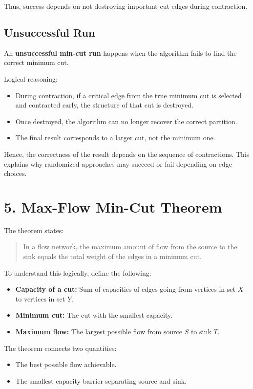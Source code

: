 \documentclass[12pt]{article}
\begin{document}
Thus, success depends on not destroying important cut edges during contraction.

\subsection*{Unsuccessful Run}

An \textbf{unsuccessful min-cut run} happens when the algorithm fails to find the correct minimum cut.

Logical reasoning:

\begin{itemize}
\item During contraction, if a critical edge from the true minimum cut is selected and contracted early, the structure of that cut is destroyed.
\item Once destroyed, the algorithm can no longer recover the correct partition.
\item The final result corresponds to a larger cut, not the minimum one.
\end{itemize}

Hence, the correctness of the result depends on the sequence of contractions. This explains why randomized approaches may succeed or fail depending on edge choices.

\section*{5. Max-Flow Min-Cut Theorem}

The theorem states:

\begin{quote}
In a flow network, the maximum amount of flow from the source to the sink equals the total weight of the edges in a minimum cut.
\end{quote}

To understand this logically, define the following:

\begin{itemize}
\item \textbf{Capacity of a cut:} Sum of capacities of edges going from vertices in set $X$ to vertices in set $Y$.
\item \textbf{Minimum cut:} The cut with the smallest capacity.
\item \textbf{Maximum flow:} The largest possible flow from source $S$ to sink $T$.
\end{itemize}

The theorem connects two quantities:
\begin{itemize}
\item The best possible flow achievable.
\item The smallest capacity barrier separating source and sink.
\end{itemize}
\end{document}
